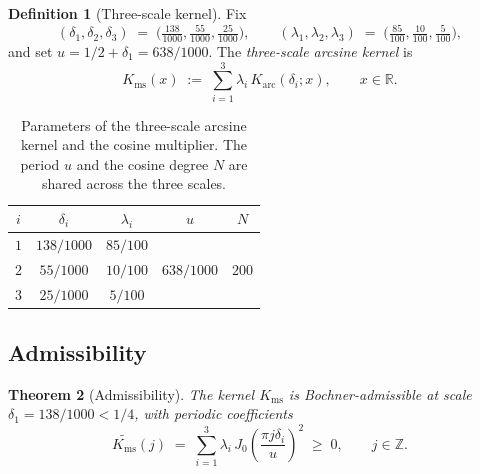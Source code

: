 \documentclass[11pt, letterpaper]{article}
\theoremstyle{plain}
\newtheorem{theorem}{Theorem}[section]
\theoremstyle{definition}
\newtheorem{definition}[theorem]{Definition}
\newcommand{\R}{\mathbb{R}}
\newcommand{\Z}{\mathbb{Z}}
\newcommand{\Karc}{K_{\mathrm{arc}}}
\newcommand{\Kms}{K_{\mathrm{ms}}}
\begin{document}
\begin{definition}[Three-scale kernel]
\label{def:Kms}
Fix
\begin{equation}\label{eq:anchors}
  (\delta_1,\delta_2,\delta_3)
  \;=\;
  \bigl(\tfrac{138}{1000},\tfrac{55}{1000},\tfrac{25}{1000}\bigr),
  \qquad
  (\lambda_1,\lambda_2,\lambda_3)
  \;=\;
  \bigl(\tfrac{85}{100},\tfrac{10}{100},\tfrac{5}{100}\bigr),
\end{equation}
and set $u=1/2+\delta_1=638/1000$.  The
\emph{three-scale arcsine kernel} is
\[
  \Kms(x)
  \;:=\;
  \sum_{i=1}^{3}\lambda_i\,\Karc(\delta_i;x),
  \qquad x\in\R.
\]
\end{definition}

\begin{table}[ht]
\centering
\begin{tabular}{ccccc}
  \toprule
  $i$ & $\delta_i$ & $\lambda_i$ & $u$ & $N$ \\
  \midrule
  $1$ & $138/1000$ & $85/100$ & \multirow{3}{*}{$638/1000$} & \multirow{3}{*}{$200$} \\
  $2$ & $55/1000$  & $10/100$ & & \\
  $3$ & $25/1000$  & $5/100$  & & \\
  \bottomrule
\end{tabular}
\caption{Parameters of the three-scale arcsine kernel and the cosine
multiplier.  The period $u$ and the cosine degree $N$ are shared
across the three scales.}
\label{tab:kernel-params}
\end{table}

\subsection{Admissibility}\label{subsec:kernel-admissibility}

\begin{theorem}[Admissibility]
\label{thm:admissibility}
The kernel $\Kms$ is Bochner-admissible at scale
$\delta_1=138/1000<1/4$, with periodic coefficients
\begin{equation}\label{eq:Ktilde}
  \widetilde{\Kms}(j)
  \;=\;
  \sum_{i=1}^{3}\lambda_i\,
       J_0\!\left(\frac{\pi j\delta_i}{u}\right)^{\!2}
  \;\ge\; 0,
  \qquad j\in\Z.
\end{equation}
\end{theorem}
\end{document}
